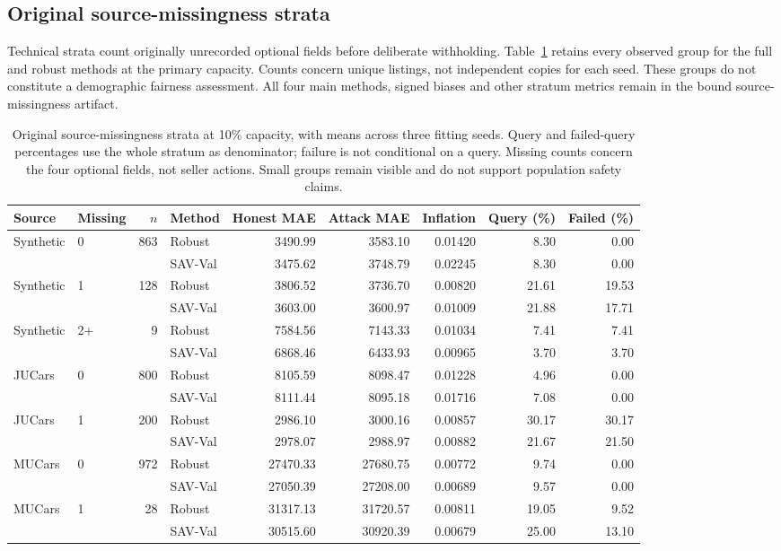 \subsection{Original source-missingness strata}
Technical strata count originally unrecorded optional fields before
deliberate withholding. Table~\ref{tab:technical_strata} retains every
observed group for the full and robust methods at the primary capacity.
Counts concern unique listings, not independent copies for each seed.
These groups do not constitute a demographic fairness assessment.
All four main methods, signed biases and other stratum metrics remain
in the bound source-missingness artifact.

\begin{table}[t]
\centering\small
\setlength{\tabcolsep}{4pt}
\caption{Original source-missingness strata at 10\% capacity, with means
across three fitting seeds. Query and failed-query percentages use the
whole stratum as denominator; failure is not conditional on a query.
Missing counts concern the four optional fields, not seller actions.
Small groups remain visible and do not support population safety claims.}
\label{tab:technical_strata}
\begin{tabular}{llrlrrrrr}
\toprule
Source & Missing & $n$ & Method & Honest MAE & Attack MAE & Inflation & Query (\%) & Failed (\%)\\
\midrule
Synthetic & 0 & 863 & Robust & 3490.99 & 3583.10 & 0.01420 & 8.30 & 0.00\\
 &  &  & SAV-Val & 3475.62 & 3748.79 & 0.02245 & 8.30 & 0.00\\
Synthetic & 1 & 128 & Robust & 3806.52 & 3736.70 & 0.00820 & 21.61 & 19.53\\
 &  &  & SAV-Val & 3603.00 & 3600.97 & 0.01009 & 21.88 & 17.71\\
Synthetic & 2+ & 9 & Robust & 7584.56 & 7143.33 & 0.01034 & 7.41 & 7.41\\
 &  &  & SAV-Val & 6868.46 & 6433.93 & 0.00965 & 3.70 & 3.70\\
\midrule
JUCars & 0 & 800 & Robust & 8105.59 & 8098.47 & 0.01228 & 4.96 & 0.00\\
 &  &  & SAV-Val & 8111.44 & 8095.18 & 0.01716 & 7.08 & 0.00\\
JUCars & 1 & 200 & Robust & 2986.10 & 3000.16 & 0.00857 & 30.17 & 30.17\\
 &  &  & SAV-Val & 2978.07 & 2988.97 & 0.00882 & 21.67 & 21.50\\
\midrule
MUCars & 0 & 972 & Robust & 27470.33 & 27680.75 & 0.00772 & 9.74 & 0.00\\
 &  &  & SAV-Val & 27050.39 & 27208.00 & 0.00689 & 9.57 & 0.00\\
MUCars & 1 & 28 & Robust & 31317.13 & 31720.57 & 0.00811 & 19.05 & 9.52\\
 &  &  & SAV-Val & 30515.60 & 30920.39 & 0.00679 & 25.00 & 13.10\\
\bottomrule
\end{tabular}
\end{table}

